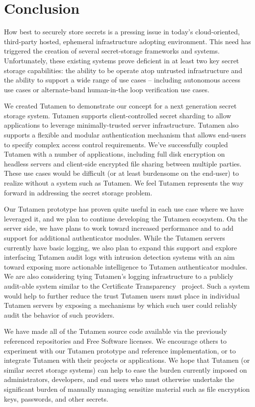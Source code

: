 \section{Conclusion}
\label{sec:conclusion}

How best to securely store secrets is a pressing issue in today's
cloud-oriented, third-party hosted, ephemeral infrastructure adopting
environment. This need has triggered the creation of several
secret-storage frameworks and systems. Unfortunately, these existing
systems prove deficient in at least two key secret storage
capabilities: the ability to be operate atop untrusted infrastructure
and the ability to support a wide range of use cases -- including
autonomous access use cases or alternate-band human-in-the loop
verification use cases.

We created Tutamen to demonstrate our concept for a next generation
secret storage system. Tutamen supports client-controlled secret
sharding to allow applications to leverage minimally-trusted server
infrastructure. Tutamen also supports a flexible and modular
authentication mechanism that allows end-users to specify complex
access control requirements. We've successfully coupled Tutamen with a
number of applications, including full disk encryption on headless
servers and client-side encrypted file sharing between multiple
parties. These use cases would be difficult (or at least burdensome on
the end-user) to realize without a system such as Tutamen. We feel
Tutamen represents the way forward in addressing the secret storage
problem.

Our Tutamen prototype has proven quite useful in each use case where
we have leveraged it, and we plan to continue developing the Tutamen
ecosystem. On the server side, we have plans to work toward increased
performance and to add support for additional authenticator
modules. While the Tutamen servers currently have basic logging, we
also plan to expand this support and explore interfacing Tutamen audit
logs with intrusion detection systems with an aim toward exposing more
actionable intelligence to Tutamen authenticator modules. We are also
considering tying Tutamen's logging infrastructure to a publicly
audit-able system similar to the Certificate
Transparency~\cite{laurie2013} project. Such a system would help to
further reduce the trust Tutamen users must place in individual
Tutamen servers by exposing a mechanisms by which such user could
reliably audit the behavior of such providers.

We have made all of the Tutamen source code available via the
previously referenced repositories and Free Software licenses. We
encourage others to experiment with our Tutamen prototype and
reference implementation, or to integrate Tutamen with their projects
or applications. We hope that Tutamen (or similar secret storage
systems) can help to ease the burden currently imposed on
administrators, developers, and end users who must otherwise undertake
the significant burden of manually managing sensitize material such as
file encryption keys, passwords, and other secrets.

